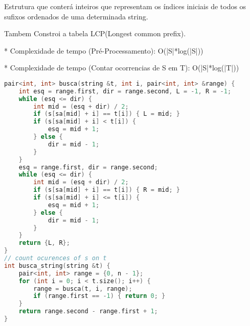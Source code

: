 \documentclass[11pt, a4paper, twoside]{book}
\begin{document}
Estrutura que conterá inteiros que representam os índices iniciais de todos os sufixos ordenados de uma determinada string.



Tambem Constroi a tabela LCP(Longest common prefix).



* Complexidade de tempo (Pré-Processamento): O(|S|*log(|S|))

* Complexidade de tempo (Contar ocorrencias de S em T): O(|S|*log(|T|))

\hfill

\begin{lstlisting}[language=C++]
pair<int, int> busca(string &t, int i, pair<int, int> &range) {
    int esq = range.first, dir = range.second, L = -1, R = -1;
    while (esq <= dir) {
        int mid = (esq + dir) / 2;
        if (s[sa[mid] + i] == t[i]) { L = mid; }
        if (s[sa[mid] + i] < t[i]) {
            esq = mid + 1;
        } else {
            dir = mid - 1;
        }
    }
    esq = range.first, dir = range.second;
    while (esq <= dir) {
        int mid = (esq + dir) / 2;
        if (s[sa[mid] + i] == t[i]) { R = mid; }
        if (s[sa[mid] + i] <= t[i]) {
            esq = mid + 1;
        } else {
            dir = mid - 1;
        }
    }
    return {L, R};
}
// count ocurences of s on t
int busca_string(string &t) {
    pair<int, int> range = {0, n - 1};
    for (int i = 0; i < t.size(); i++) {
        range = busca(t, i, range);
        if (range.first == -1) { return 0; }
    }
    return range.second - range.first + 1;
}\end{lstlisting}

\hfill
\end{document}
